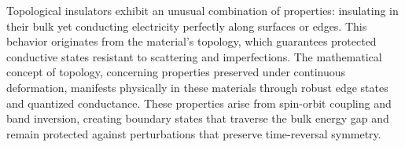 Topological insulators exhibit an unusual combination of properties: insulating in their bulk yet conducting electricity perfectly along surfaces or edges. This behavior originates from the material's topology, which guarantees protected conductive states resistant to scattering and imperfections. The mathematical concept of topology, concerning properties preserved under continuous deformation, manifests physically in these materials through robust edge states and quantized conductance. These properties arise from spin-orbit coupling and band inversion, creating boundary states that traverse the bulk energy gap and remain protected against perturbations that preserve time-reversal symmetry.
